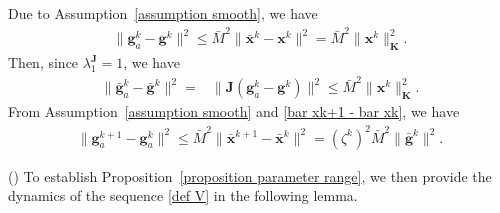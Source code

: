 \documentclass[12pt,draftcls,onecolumn]{IEEEtran}
\begin{document}
Due to Assumption~\ref{assumption smooth}, we have
\begin{align}
	\|\mathbf{g}_a^k - \mathbf{g}^k\|^2 \leq \bar{M}^2\|\bar{\mathbf{x}}^k - \mathbf{x}^k\|^2 = \bar{M}^2 \|\mathbf{x}^k\|^2_\mathbf{K}. \label{g0k-gk}
\end{align}
Then, since $\lambda_1^{\mathbf{J}} = 1$, we have
\begin{align}
	\|\bar{\mathbf{g}}_a^k - \bar{\mathbf{g}}^k\|^2 = & \|\mathbf{J}(\mathbf{g}_a^k - \mathbf{g}^k)\|^2 \leq \bar{M}^2 \|\mathbf{x}^k\|^2_\mathbf{K}. \label{bar g0k- bar gk}
\end{align}
From Assumption~\ref{assumption smooth} and \eqref{bar xk+1 - bar xk}, we have
\begin{align}
	\|\mathbf{g}_a^{k+1} - \mathbf{g}_a^k\|^2 \leq \bar{M}^2 \|\bar{\mathbf{x}}^{k+1} - \bar{\mathbf{x}}^{k}\|^2 = (\zeta^k)^2 \bar{M}^2\|\bar{\mathbf{g}}^k\|^2. \label{g0k+1-g0k}
\end{align}

() To establish Proposition~\ref{proposition parameter range}, we then provide the dynamics of the sequence \eqref{def V} in the following lemma.
\end{document}
